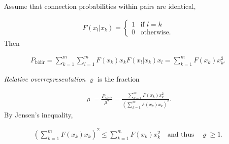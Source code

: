 \begin{frame}{}
  Assume that connection probabilities within pairs are identical,
  
\begin{align*}
  F(x_l | x_k) = \begin{cases} 1 & \text{if $l = k$} \\ 0 & \text{otherwise.} \end{cases}
\end{align*}
Then

\begin{align*}
  P_{\text{bidir}} = \sum_{k=1}^m \sum_{l=1}^m F(x_k) x_k F(x_l | x_k) x_l = \sum_{k=1}^m F(x_k) x_k^2 .
\end{align*}

\vspace{0.4cm}

\textit{Relative overrepresentation} $\varrho$ is the fraction

\begin{align*}
  \varrho = \frac{P_{\text{bidir}}}{\mu^2} = \frac{\sum_{k=1}^m F(x_k) x_k^2 }{\left(\sum_{k=1}^m F(x_k) x_k\right)^2}.
\end{align*}
By Jensen's inequality,

\begin{align*}
  \left(\sum_{k=1}^m F(x_k) x_k\right)^2 \leq \sum_{k=1}^m F(x_k) x_k^2  \quad \text{and thus} \quad \varrho \geq 1.
\end{align*}	

\end{frame}
